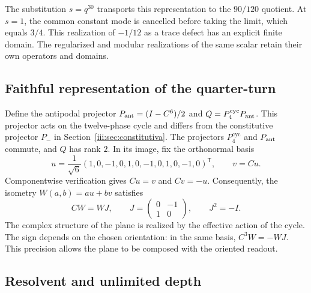 The substitution $s=q^{30}$ transports this representation to the
$90/120$ quotient. At $s=1$, the common constant mode is cancelled before taking
the limit, which equals $3/4$. This realization of $-1/12$ as a trace defect
has an explicit finite domain. The regularized and modular
realizations of the same scalar retain their own operators and domains.

\subsection{Faithful representation of the quarter-turn}

Define the antipodal projector $P_{\rm ant}=(I-C^6)/2$ and
$Q=P_4^{\mathrm{cyc}}P_{\rm ant}$. This projector acts on the twelve-phase cycle and
differs from the constitutive projector $P_-$ in Section~\ref{iii:sec:constitutiva}.
The projectors $P_4^{\mathrm{cyc}}$ and $P_{\rm ant}$ commute, and
$Q$ has rank $2$. In its image, fix the orthonormal basis
\begin{equation}
 u=\frac1{\sqrt6}(1,0,-1,0,1,0,-1,0,1,0,-1,0)^{\mathsf T},
 \qquad v=Cu.
 \label{iii:eq:uv}
\end{equation}
Componentwise verification gives $Cu=v$ and $Cv=-u$. Consequently,
the isometry $W(a,b)=au+bv$ satisfies
\begin{equation}
 CW=WJ,\qquad
 J=\begin{pmatrix}0&-1\\1&0\end{pmatrix},\qquad J^2=-I.
 \label{iii:eq:quarter-intertwiner}
\end{equation}
The complex structure of the plane is realized by the effective action of
the cycle. The sign depends on the chosen orientation: in the same basis,
$C^3W=-WJ$. This precision allows the plane to be composed with the oriented readout.

\subsection{Resolvent and unlimited depth}

